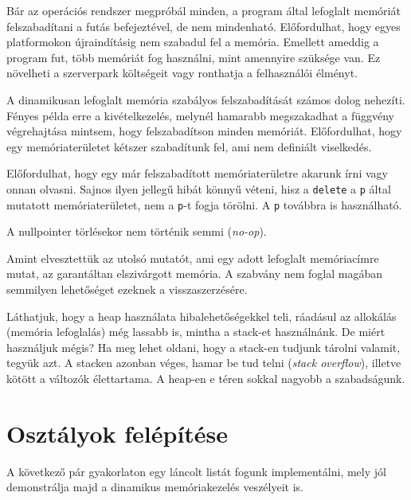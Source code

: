 \documentclass[a4paper,11.5pt,table]{article}
\begin{document}
	Bár az operációs rendszer megpróbál minden, a program által lefoglalt memóriát felszabadítani a futás befejeztével, de nem mindenható. Előfordulhat, hogy egyes platformokon újraindításig nem szabadul fel a memória. Emellett ameddig a program fut, több memóriát fog használni, mint amennyire szüksége van. Ez növelheti a szerverpark költségeit vagy ronthatja a felhasználói élményt.
	\medskip
	
	A dinamikusan lefoglalt memória szabályos felszabadítását számos dolog nehezíti. Fényes példa erre a kivételkezelés, melynél hamarabb megszakadhat a függvény végrehajtása mintsem, hogy felszabadítson minden memóriát. Előfordulhat, hogy egy memóriaterületet kétszer szabadítunk fel, ami nem definiált viselkedés.
	\medskip
	
  Előfordulhat, hogy egy már felszabadított memóriaterületre akarunk írni vagy onnan olvasni. Sajnos ilyen jellegű hibát könnyű véteni, hisz a \texttt{delete} a \texttt{p} által mutatott memóriaterületet, nem a \texttt{p}-t fogja törölni. A \texttt{p} továbbra is használható.
	\begin{note}
		A nullpointer törlésekor nem történik semmi (\textit{no-op}).
	\end{note}
	\begin{note}
		Amint elvesztettük az utolsó mutatót, ami egy adott lefoglalt memóriacímre mutat, az garantáltan elszivárgott memória. A szabvány nem foglal magában semmilyen lehetőséget ezeknek a visszaszerzésére.
	\end{note}
	Láthatjuk, hogy a heap használata hibalehetőségekkel teli, ráadásul az allokálás (memória lefoglalás) még lassabb is, mintha a stack-et használnánk. De miért használjuk mégis? Ha meg lehet oldani, hogy a stack-en tudjunk tárolni valamit, tegyük azt. A stacken azonban véges, hamar be tud telni (\textit{stack overflow}), illetve kötött a változók élettartama. A heap-en e téren sokkal nagyobb a szabadságunk.
	\section{Osztályok felépítése}
	A következő pár gyakorlaton egy láncolt listát fogunk implementálni, mely jól demonstrálja majd a dinamikus memóriakezelés veszélyeit is.
	
\end{document}
